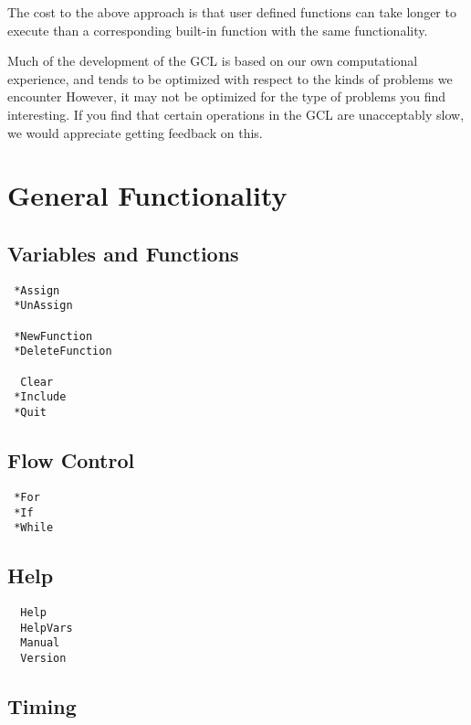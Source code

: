The cost to the above approach is that user defined functions can take
longer to execute than a corresponding built-in function with the same
functionality.

Much of the development of the GCL is based on our own computational
experience, and tends to be optimized with respect to the kinds of
problems we encounter  However, it may not be optimized
for the type of problems you find interesting.  If you find that
certain operations in the GCL are unacceptably slow, we would
appreciate getting feedback on this.

\section{General Functionality}

\subsection{Variables and Functions}

\begin{multicols}{3}
\begin{verbatim}
 *Assign 
 *UnAssign 

 *NewFunction
 *DeleteFunction

  Clear 
 *Include
 *Quit
\end{verbatim}
\end{multicols}

\subsection{Flow Control}

\begin{multicols}{3}
\begin{verbatim}
 *For
 *If
 *While
\end{verbatim}
\end{multicols}

\subsection{Help}

\begin{multicols}{3}
\begin{verbatim}
  Help 
  HelpVars 
  Manual 
  Version 
\end{verbatim}
\end{multicols}


\subsection{Timing}


